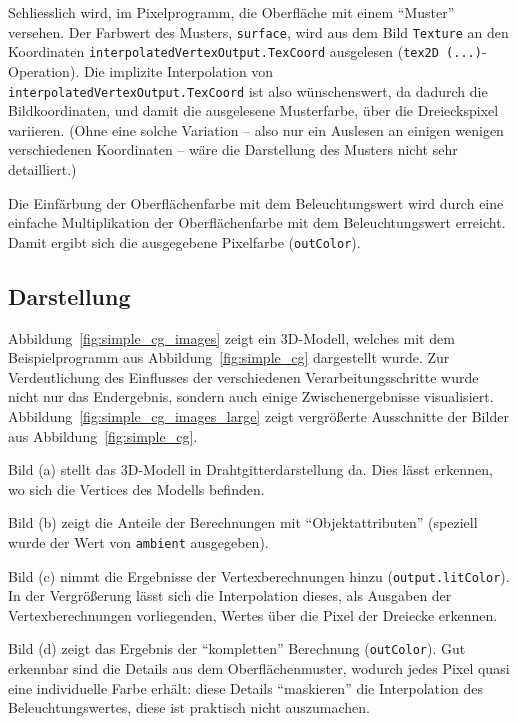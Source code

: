 \documentclass[twoside,a4paper,fleqn,12pt]{book}
\begin{document}
Schliesslich wird, im Pixelprogramm, die Oberfläche mit einem "`Muster"' versehen. Der Farbwert des Musters, \verb+surface+, wird aus dem Bild \verb+Texture+
an den Koordinaten \verb+interpolatedVertexOutput.TexCoord+ ausgelesen (\verb+tex2D (...)+-Operation).
Die implizite Interpolation von \verb+interpolatedVertexOutput.TexCoord+ ist also wünschenswert, da dadurch die Bildkoordinaten,
und damit die ausgelesene Musterfarbe, über die Dreieckspixel variieren. (Ohne eine solche Variation -- also nur ein Auslesen an einigen wenigen verschiedenen Koordinaten --
wäre die Darstellung des Musters nicht sehr detailliert.)

Die Einfärbung der Oberflächenfarbe mit dem Beleuchtungswert wird durch eine einfache Multiplikation der Oberflächenfarbe mit
dem Beleuchtungswert erreicht. Damit ergibt sich die ausgegebene Pixelfarbe (\verb+outColor+).

\subsection{Darstellung}

Abbildung~\ref{fig:simple_cg_images} zeigt ein 3D-Modell, welches mit dem Beispielprogramm aus Abbildung~\ref{fig:simple_cg} dargestellt wurde.
Zur Verdeutlichung des Einflusses der verschiedenen Verarbeitungsschritte wurde nicht nur das Endergebnis, sondern auch einige Zwischenergebnisse
visualisiert. Abbildung~\ref{fig:simple_cg_images_large} zeigt vergrößerte Ausschnitte der Bilder aus Abbildung~\ref{fig:simple_cg}.

Bild (a) stellt das 3D-Modell in Drahtgitterdarstellung da. Dies lässt erkennen, wo sich die Vertices des Modells befinden.

Bild (b) zeigt die Anteile der Berechnungen mit  "`Objektattributen"' (speziell wurde der Wert von \verb+ambient+ ausgegeben).

Bild (c) nimmt die Ergebnisse der Vertexberechnungen hinzu (\verb+output.litColor+). In der Vergrößerung lässt sich die Interpolation
dieses, als Ausgaben der Vertexberechnungen vorliegenden, Wertes über die Pixel der Dreiecke erkennen.

Bild (d) zeigt das Ergebnis der "`kompletten"' Berechnung (\verb+outColor+). Gut erkennbar sind die Details aus dem Oberflächenmuster,
wodurch jedes Pixel quasi eine individuelle Farbe erhält: diese Details "`maskieren"' die Interpolation des Beleuchtungswertes, diese ist
praktisch nicht auszumachen.
\end{document}
